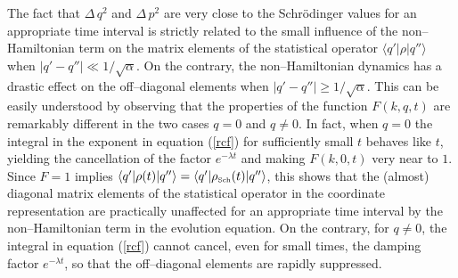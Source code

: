 \documentclass[10pt,a4paper]{article}
\begin{document}
The fact that $\Delta \, q^{2}$ and $\Delta \, p^{2}$ are very
close to the Schr\"odinger values for an appropriate time interval
is strictly related to the small influence of the non--Hamiltonian
term on the matrix elements of the statistical operator $\langle
q'|\rho| q''\rangle$ when $| q' - q'' | \ll  1/\sqrt{\alpha}$. On
the contrary, the non--Hamiltonian dynamics has a drastic effect
on the off--diagonal elements when $| q' - q'' | \geq
1/\sqrt{\alpha}$. This can be easily understood by observing that
the properties of the function $F(k,q,t)$ are remarkably different
in the two cases $q=0$ and $q \neq 0$. In fact, when $q=0$ the
integral in the exponent in equation (\ref{rcf}) for sufficiently
small $t$ behaves like $t$, yielding the cancellation of the
factor $e^{-\lambda t}$ and making $F(k,0,t)$ very near to $1$.
Since $F=1$ implies $\langle q'|\rho(t)|q''\rangle = \langle
q'|\rho_{\makebox{\tiny Sch}}(t)|q''\rangle$, this shows that the
(almost) diagonal matrix elements of the statistical operator in
the coordinate representation are practically unaffected for an
appropriate time interval  by the non--Hamiltonian term in the
evolution equation. On the contrary, for $q\neq 0$, the integral
in equation (\ref{rcf}) cannot cancel, even for small times, the
damping factor $e^{-\lambda t}$, so that the off--diagonal
elements are rapidly suppressed.
\end{document}
